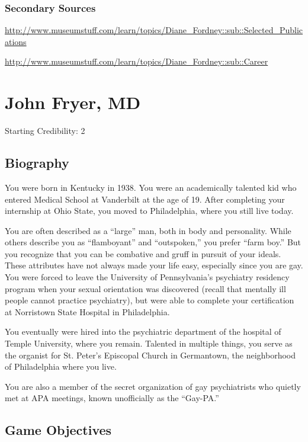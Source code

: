 \begin{refsection}
\subsection{Secondary Sources}
\label{secondarysources}

\url{http://www.museumstuff.com/learn/topics/Diane_Fordney::sub::Selected_Publications}

\url{http://www.museumstuff.com/learn/topics/Diane_Fordney::sub::Career}

\chapter{John Fryer, MD}
\label{johnfryermd}

Starting Credibility: 2

\section{Biography}
\label{biography}

You were born in Kentucky in 1938. You were an academically talented kid who entered Medical School at Vanderbilt at the age of 19. After completing your internship at Ohio State, you moved to Philadelphia, where you still live today.

You are often described as a “large” man, both in body and personality. While others describe you as “flamboyant” and “outspoken,” you prefer “farm boy.” But you recognize that you can be combative and gruff in pursuit of your ideals. These attributes have not always made your life easy, especially since you are gay. You were forced to leave the University of Pennsylvania's psychiatry residency program when your sexual orientation was discovered (recall that mentally ill people cannot practice psychiatry), but were able to complete your certification at Norristown State Hospital in Philadelphia.

You eventually were hired into the psychiatric department of the hospital of Temple University, where you remain. Talented in multiple things, you serve as the organist for St. Peter's Episcopal Church in Germantown, the neighborhood of Philadelphia where you live.

You are also a member of the secret organization of gay psychiatrists who quietly met at APA meetings, known unofficially as the “Gay-PA.”

\section{Game Objectives}
\label{gameobjectives}


\end{refsection}

